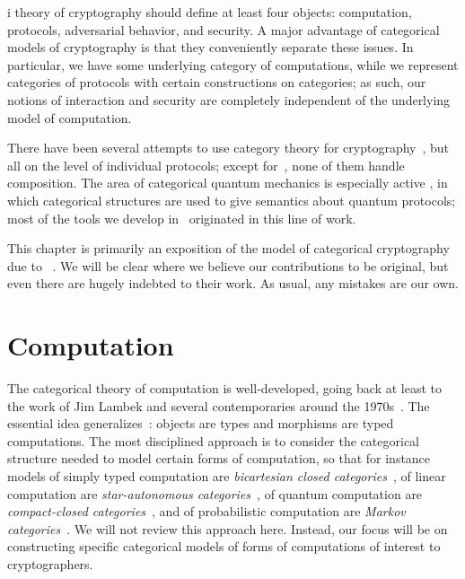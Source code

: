 i theory of cryptography should define at least four objects: computation,
protocols, adversarial behavior, and security. A major advantage of categorical
models of cryptography is that they conveniently separate these issues. In
particular, we have some underlying category of computations, while we represent
categories of protocols with certain constructions on categories; as such, our
notions of interaction and security are completely independent of the underlying
model of computation.

There have been several attempts to use category theory for
cryptography~\cite{hines-2020,pavlovic-2012,pavlovic-2014,stay-vicary-2013,bkm-2019,bmr-2019},
but all on the level of individual protocols; except
for~\cite{broadbent-karvonen-2022}, none of them handle composition. The area of
categorical quantum mechanics is especially active
\cite{abramsky-coecke-2004,coecke-perdrix-2012,heunen-vicary-2014,coecke-kissinger-2017,chitambar-gour-2019},
in which categorical structures are used to give semantics about quantum
protocols; most of the tools we develop in~
originated in this line of work.

This chapter is primarily an exposition of the model of categorical cryptography
due to \citeauthor{broadbent-karvonen-2022}~\cite{broadbent-karvonen-2022}. We
will be clear where we believe our contributions to be original, but even there
are hugely indebted to their work. As usual, any mistakes are our own.

\section{Computation}
\label{sec:computation}

The categorical theory of computation is well-developed, going back at least to
the work of Jim Lambek and several contemporaries around the
1970s~\cite{lambeck-1974,lambeck-1980,lawvere-1969,seely-1984}. The essential
idea generalizes~: objects are types
and morphisms are typed computations. The most disciplined approach is to
consider the categorical structure needed to model certain forms of computation, so that
for instance models of simply typed computation are \emph{bicartesian closed
categories}~\cite{lambeck-1974}, of linear computation are \emph{star-autonomous
categories}~\cite{seely-1989}, of quantum computation are \emph{compact-closed
categories}~\cite{abramsky-coecke-2004}, and of probabilistic computation are \emph{Markov
categories}~\cite{fritz-2020}. We will not review this approach here. Instead,
our focus will be on constructing specific categorical models of forms of
computations of interest to cryptographers.

